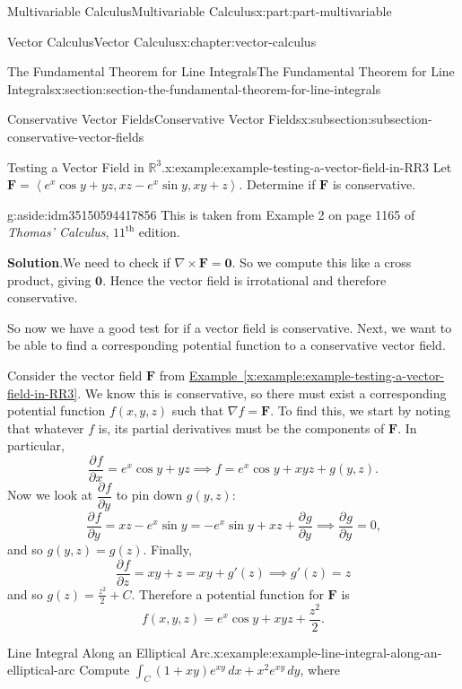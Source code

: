 \documentclass[twoside,10pt,]{tufte-book}
\newcommand{\blocktitlefont}{\relax}
\newcommand{\xreffont}{\relax}
\numberwithin{equation}{part}
\newcommand{\RR}{\mathbb{R}}
\newcommand{\grad}{\nabla}
\newcommand{\curl}{\nabla\times}
\newcommand{\vb}[1]{\mathbf{#1}}
\newcommand{\pdv}[3][]{\dfrac{\partial^{#1} #2}{\partial #3^{#1}}}
\newcommand{\dotprod}[1]{\left\langle #1 \right\rangle}
\begin{document}
\begin{partptx}{Multivariable Calculus}{}{Multivariable Calculus}{}{}{x:part:part-multivariable}
\begin{chapterptx}{Vector Calculus}{}{Vector Calculus}{}{}{x:chapter:vector-calculus}
\begin{sectionptx}{The Fundamental Theorem for Line Integrals}{}{The Fundamental Theorem for Line Integrals}{}{}{x:section:section-the-fundamental-theorem-for-line-integrals}
\begin{subsectionptx}{Conservative Vector Fields}{}{Conservative Vector Fields}{}{}{x:subsection:subsection-conservative-vector-fields}
\begin{example}{Testing a Vector Field in \(\RR^{3}\).}{x:example:example-testing-a-vector-field-in-RR3}%
Let \(\vb{F} = \dotprod{e^{x}\cos y + yz, xz - e^{x}\sin y, xy + z}\). Determine if \(\vb{F}\) is conservative.%
\begin{aside}{}{g:aside:idm35150594417856}%
This is taken from Example 2 on page 1165 of \emph{Thomas' Calculus}, \(11^{\text{th}}\) edition.%
\end{aside}
\par\smallskip%
\noindent\textbf{\blocktitlefont Solution}.\hypertarget{g:solution:idm35150594416704}{}\quad{}We need to check if \(\curl\vb{F} = \vb{0}\). So we compute this like a cross product, giving \(\vb{0}\). Hence the vector field is irrotational and therefore conservative.%
\end{example}
So now we have a good test for if a vector field is conservative. Next, we want to be able to find a corresponding potential function to a conservative vector field.%
\par
Consider the vector field \(\vb{F}\) from \hyperref[x:example:example-testing-a-vector-field-in-RR3]{Example~{\xreffont\ref{x:example:example-testing-a-vector-field-in-RR3}}}. We know this is conservative, so there must exist a corresponding potential function \(f(x,y,z)\) such that \(\grad f = \vb{F}\). To find this, we start by noting that whatever \(f\) is, its partial derivatives must be the components of \(\vb{F}\). In particular,%
\begin{equation*}
\pdv{f}{x} = e^{x}\cos y + yz \implies f = e^{x}\cos y + xyz + g(y,z)\text{.}
\end{equation*}
Now we look at \(\pdv{f}{y}\) to pin down \(g(y,z)\):%
\begin{equation*}
\pdv{f}{y} = xz - e^{x}\sin y = -e^{x}\sin y + xz + \pdv{g}{y} \implies \pdv{g}{y} = 0\text{,}
\end{equation*}
and so \(g(y,z) = g(z)\). Finally,%
\begin{equation*}
\pdv{f}{z} = xy + z = xy + g'(z) \implies g'(z) = z
\end{equation*}
and so \(g(z) = \frac{z^{2}}{2} + C\). Therefore a potential function for \(\vb{F}\) is%
\begin{equation*}
f(x,y,z) = e^{x}\cos y + xyz + \frac{z^{2}}{2}\text{.}
\end{equation*}
%
\begin{example}{Line Integral Along an Elliptical Arc.}{x:example:example-line-integral-along-an-elliptical-arc}%
Compute \(\int_{C}(1 + xy)e^{xy}\,dx + x^{2}e^{xy}\,dy\), where%

\end{example}
\end{subsectionptx}
\end{sectionptx}
\end{chapterptx}
\end{partptx}
\end{document}
